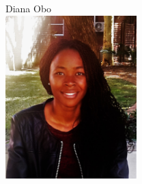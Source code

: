 \documentclass[a4paper,12pt]{article}
\begin{document}
\begin{center}
{\Large Diana {Obo}} \\[0.3cm]
\includegraphics[width= 2in]{Diana.jpg}\\[0.4cm] 
\end{center}
\end{document}
